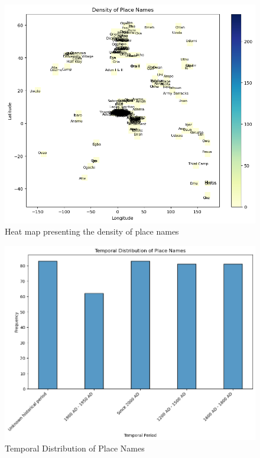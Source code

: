 \begin{figure}[H]
    \centering
    \includegraphics[width=1\linewidth]{heatmap1.png}
    \caption{Heat map presenting the density of place names}
    \label{fig:heatmap}
\end{figure}


\begin{figure}[H]
    \centering
    \includegraphics[width=1\linewidth]{output2.png}
    \caption{Temporal Distribution of Place Names}
    \label{fig:histgram}
\end{figure}

